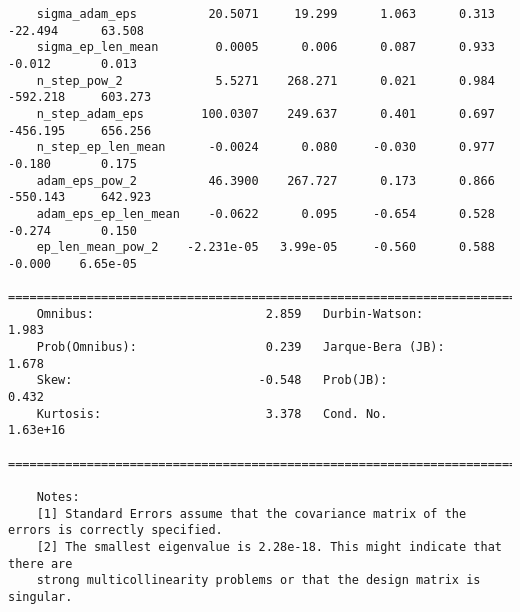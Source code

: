 \begin{verbatim}
    sigma_adam_eps          20.5071     19.299      1.063      0.313     -22.494      63.508
    sigma_ep_len_mean        0.0005      0.006      0.087      0.933      -0.012       0.013
    n_step_pow_2             5.5271    268.271      0.021      0.984    -592.218     603.273
    n_step_adam_eps        100.0307    249.637      0.401      0.697    -456.195     656.256
    n_step_ep_len_mean      -0.0024      0.080     -0.030      0.977      -0.180       0.175
    adam_eps_pow_2          46.3900    267.727      0.173      0.866    -550.143     642.923
    adam_eps_ep_len_mean    -0.0622      0.095     -0.654      0.528      -0.274       0.150
    ep_len_mean_pow_2    -2.231e-05   3.99e-05     -0.560      0.588      -0.000    6.65e-05
    ==============================================================================
    Omnibus:                        2.859   Durbin-Watson:                   1.983
    Prob(Omnibus):                  0.239   Jarque-Bera (JB):                1.678
    Skew:                          -0.548   Prob(JB):                        0.432
    Kurtosis:                       3.378   Cond. No.                     1.63e+16
    ==============================================================================
    
    Notes:
    [1] Standard Errors assume that the covariance matrix of the errors is correctly specified.
    [2] The smallest eigenvalue is 2.28e-18. This might indicate that there are
    strong multicollinearity problems or that the design matrix is singular.
\end{verbatim}

\clearpage

